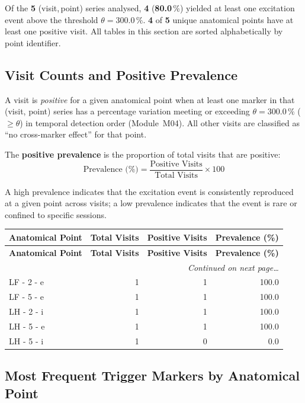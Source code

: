 \documentclass[a4paper,11pt]{article}
\begin{document}
\noindent
Of the \textbf{5} (visit,\,point) series analysed,
\textbf{4} (\textbf{80.0}\,\%) yielded at least one
excitation event above the threshold $\theta = 300.0\,\%$.
\textbf{4} of \textbf{5} unique anatomical points
have at least one positive visit.
All tables in this section are sorted alphabetically by point identifier.

\subsection{Visit Counts and Positive Prevalence}

A visit is \emph{positive} for a given anatomical point when at least one marker in that
(visit, point) series has a percentage variation meeting or exceeding
$\theta = 300.0\,\%$ ($\geq \theta$) in temporal detection order (Module~M04).
All other visits are classified as ``no cross-marker effect'' for that point.

The \textbf{positive prevalence} is the proportion of total visits that are positive:
\[
  \text{Prevalence (\%)} = \frac{\text{Positive Visits}}{\text{Total Visits}} \times 100
\]

A high prevalence indicates that the excitation event is consistently reproduced at a given
point across visits; a low prevalence indicates that the event is rare or confined to
specific sessions.

\begin{small}
\begin{longtable}{p{5cm}rrr}
\toprule
\textbf{Anatomical Point} &
\textbf{Total Visits} &
\textbf{Positive Visits} &
\textbf{Prevalence (\%)} \\
\midrule
\endfirsthead
\toprule
\textbf{Anatomical Point} &
\textbf{Total Visits} &
\textbf{Positive Visits} &
\textbf{Prevalence (\%)} \\
\midrule
\endhead
\midrule
\multicolumn{4}{r}{\small\emph{Continued on next page\ldots}} \\
\endfoot
\bottomrule
\endlastfoot
LF - 2 - e & 1 & 1 & 100.0 \\
LF - 5 - e & 1 & 1 & 100.0 \\
LH - 2 - i & 1 & 1 & 100.0 \\
LH - 5 - e & 1 & 1 & 100.0 \\
LH - 5 - i & 1 & 0 & 0.0 \\
\end{longtable}
\end{small}

\subsection{Most Frequent Trigger Markers by Anatomical Point}
\end{document}
